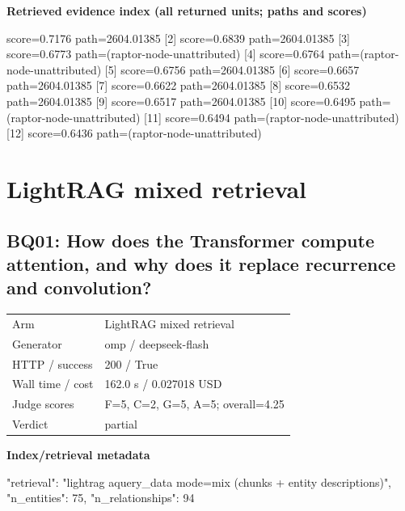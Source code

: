 \documentclass[10pt]{article}
\begin{document}
\textbf{Retrieved evidence index (all returned units; paths and scores) }
\begin{EvidenceText}
[1] score=0.7176 path=2604.01385
[2] score=0.6839 path=2604.01385
[3] score=0.6773 path=(raptor-node-unattributed)
[4] score=0.6764 path=(raptor-node-unattributed)
[5] score=0.6756 path=2604.01385
[6] score=0.6657 path=2604.01385
[7] score=0.6622 path=2604.01385
[8] score=0.6532 path=2604.01385
[9] score=0.6517 path=2604.01385
[10] score=0.6495 path=(raptor-node-unattributed)
[11] score=0.6494 path=(raptor-node-unattributed)
[12] score=0.6436 path=(raptor-node-unattributed)
\end{EvidenceText}
\section{LightRAG mixed retrieval}
\subsection{BQ01: How does the Transformer compute attention, and why does it replace recurrence and convolution?}
\begin{tabular}{@{}ll@{}}
Arm & LightRAG mixed retrieval\\
Generator & omp / deepseek-flash\\
HTTP / success & 200 / True\\
Wall time / cost & 162.0 s / 0.027018 USD\\
Judge scores & F=5, C=2, G=5, A=5; overall=4.25\\
Verdict & partial\\
\end{tabular}

\textbf{Index/retrieval metadata}
\begin{EvidenceText}
{
  "retrieval": "lightrag aquery_data mode=mix (chunks + entity descriptions)",
  "n_entities": 75,
  "n_relationships": 94
}
\end{EvidenceText}
\end{document}
